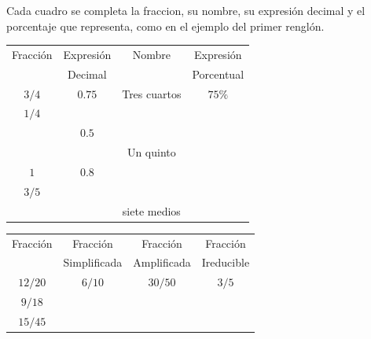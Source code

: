 \documentclass[11pt]{examdesign}
\begin{document}
    \begin{shortanswer}[title={Completar los siguientes cuadros siguiendo el ejemplo dado:},
    	rearrange=no,resetcounter=no]
    	
        
        \begin{question}
        Cada cuadro se completa la fraccion, su nombre, su expresión decimal y el porcentaje que representa, como en el ejemplo del primer renglón.
        	\begin{multicols}{2}
        		
        		\begin{tabular}{|c|c|c|c|}
        			\hline
        			{\scriptsize Fracción}      &{\scriptsize Expresión}&{\scriptsize Nombre}	 &{\scriptsize Expresión}
        			\\
        			&{\scriptsize Decimal}     &            &{\scriptsize Porcentual}
        			\\\hline
        			$3/4$ & $0.75$  & Tres cuartos&$75\%$
        			\\\hline
        			$1/4$ &         &           &             
        			\\\hline
        			& $0.5$   &           &
        			\\\hline
        			&         & Un quinto&
        			\\\hline
        			$1$           & $0.8$   &           &
        			\\\hline
        			$3/5$ &         &           &
        			\\\hline
        			&         &{\scriptsize siete medios}&
        			\\\hline
        		\end{tabular}
        		\begin{tabular}{|c|c|c|c|}
        			\hline
        			{\scriptsize Fracción}      &{\scriptsize Fracción}     &{\scriptsize Fracción}	 &{\scriptsize Fracción}
        			\\
        			&{\scriptsize Simplificada} &{\scriptsize Amplificada} &{\scriptsize Ireducible}
        			\\\hline
        			$12/20$  & $6/10$  &$30/50$  & $3/5$
        			\\\hline
        			$9/18$   &         &         &             
        			\\\hline
        			$15/45$  &         &         &
        			\\\hline

\end{tabular}
\end{multicols}
\end{question}
\end{shortanswer}
\end{document}

